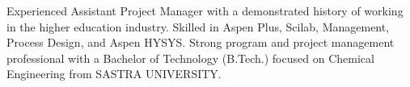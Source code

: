 

\begin{cvparagraph}

Experienced Assistant Project Manager with a demonstrated history of working in the higher education industry. Skilled in Aspen Plus, Scilab, Management, Process Design, and Aspen HYSYS. Strong program and project management professional with a Bachelor of Technology (B.Tech.) focused on Chemical Engineering from SASTRA UNIVERSITY.
\end{cvparagraph}

